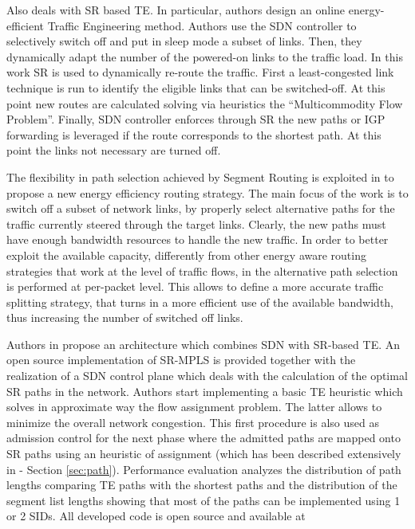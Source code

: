 Also \cite{energyefficient} deals with SR based TE. In particular, authors design an online energy-efficient Traffic Engineering method. Authors use the SDN controller to selectively switch off and put in sleep mode a subset of links. Then, they dynamically adapt the number of the powered-on links to the traffic load.
In this work SR is used to dynamically re-route the traffic. First a least-congested link technique is run to identify the eligible links that can be switched-off. At this point new routes are calculated solving via heuristics the ``Multicommodity Flow Problem''. Finally, SDN controller enforces through SR the new paths or IGP forwarding is leveraged if the route corresponds to the shortest path. At this point the links not necessary are turned off. 

The flexibility in path selection achieved by Segment Routing is exploited in \cite{ghuman2017per} to propose a new energy efficiency routing strategy.
The main focus of the work is to switch off a subset of network links, by properly select alternative paths for the traffic currently steered through the target links.
Clearly, the new paths must have enough bandwidth resources to handle the new traffic.
In order to better exploit the available capacity, differently from other energy aware routing strategies that work at the level of traffic flows, in \cite{ghuman2017per} the alternative path selection is performed at per-packet level.
This allows to define a more accurate traffic splitting strategy, that turns in a more efficient use of the available bandwidth, thus increasing the number of switched off links.

Authors in \cite{trafficpmsr} propose an architecture which combines SDN with SR-based TE. An open source implementation of SR-MPLS is provided together with the realization of a SDN control plane which deals with the calculation of the optimal SR paths in the network. Authors start implementing a basic TE heuristic which solves in approximate way the flow assignment problem. The latter allows to minimize the overall network congestion. This first procedure is also used as admission control for the next phase where the admitted paths are mapped onto SR paths using an heuristic of assignment (which has been described extensively in \cite{pmsr} - Section \ref{sec:path}). Performance evaluation analyzes the distribution of path lengths comparing TE paths with the shortest paths and the distribution of the segment list lengths showing that most of the paths can be implemented using 1 or 2 SIDs. All developed code is open source and available at \cite{pmsrcode}


